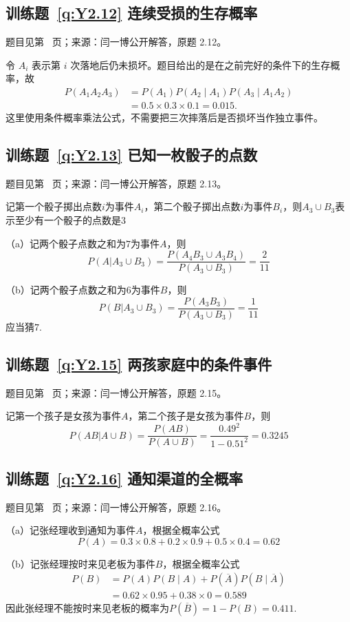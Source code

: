 \subsection*{训练题~\ref{q:Y2.12} 连续受损的生存概率}\label{a:Y2.12}{\small 题目见第~\pageref{q:Y2.12} 页；来源：闫一博公开解答，原题 2.12。}
\begin{solve}令 $A_i$ 表示第 $i$ 次落地后仍未损坏。题目给出的是在之前完好的条件下的生存概率，故\[\begin{aligned}P(A_1A_2A_3)&=P(A_1)P(A_2\mid A_1)P(A_3\mid A_1A_2)\\&=0.5\times0.3\times0.1=0.015.\end{aligned}\]这里使用条件概率乘法公式，不需要把三次摔落后是否损坏当作独立事件。\end{solve}

\subsection*{训练题~\ref{q:Y2.13} 已知一枚骰子的点数}\label{a:Y2.13}{\small 题目见第~\pageref{q:Y2.13} 页；来源：闫一博公开解答，原题 2.13。}
\begin{solve}
记第一个骰子掷出点数$i$为事件$A_i$，第二个骰子掷出点数$i$为事件$B_i$，则$A_3\cup B_3$表示至少有一个骰子的点数是$3$

（a）记两个骰子点数之和为$7$为事件$A$，则
\[P(A|{A_3} \cup {B_3}) = \frac{{P({A_4}{B_3} \cup {A_3}{B_4})}}{{P({A_3} \cup {B_3})}} = \frac{2}{{11}}\]

（b）记两个骰子点数之和为$6$为事件$B$，则
\[P(B|{A_3} \cup {B_3}) = \frac{{P({A_3}{B_3})}}{{P({A_3} \cup {B_3})}} = \frac{1}{{11}}\]
应当猜$7$.
\end{solve}

\subsection*{训练题~\ref{q:Y2.15} 两孩家庭中的条件事件}\label{a:Y2.15}{\small 题目见第~\pageref{q:Y2.15} 页；来源：闫一博公开解答，原题 2.15。}
\begin{solve}
记第一个孩子是女孩为事件$A$，第二个孩子是女孩为事件$B$，则
\[P(AB|A \cup B) = \frac{{P(AB)}}{{P(A \cup B)}} = \frac{{{{0.49}^2}}}{{1 - {{0.51}^2}}} = 0.3245\]
\end{solve}

\subsection*{训练题~\ref{q:Y2.16} 通知渠道的全概率}\label{a:Y2.16}{\small 题目见第~\pageref{q:Y2.16} 页；来源：闫一博公开解答，原题 2.16。}
\begin{solve}
（a）记张经理收到通知为事件$A$，根据全概率公式
\[P(A) = 0.3 \times 0.8 + 0.2 \times 0.9 + 0.5 \times 0.4 = 0.62\]

（b）记张经理按时来见老板为事件$B$，根据全概率公式
\[\begin{aligned}P(B)&=P(A)P(B\mid A)+P(\overline A)P(B\mid\overline A)\\&=0.62\times0.95+0.38\times0=0.589\end{aligned}\]
因此张经理不能按时来见老板的概率为$P(\overline{B})=1-P(B)=0.411$.
\end{solve}

